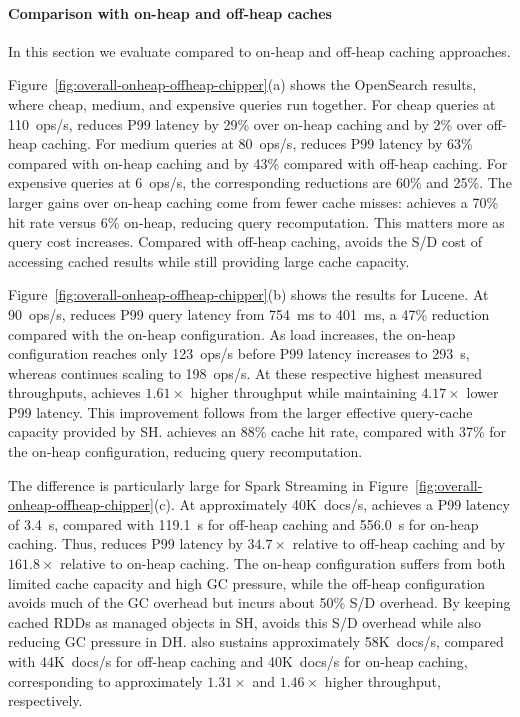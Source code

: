 \paragraph{\textbf{Comparison with on-heap and off-heap caches}}
In this section we evaluate \chipperName{} compared to on-heap and off-heap caching approaches.

Figure~\ref{fig:overall-onheap-offheap-chipper}(a) shows the OpenSearch results, where cheap, medium, and expensive queries run together.
For cheap queries at 110~ops/s, \chipperName{} reduces P99 latency by 29\% over on-heap caching and by 2\% over off-heap caching.
For medium queries at 80~ops/s, \chipperName{} reduces P99 latency by 63\% compared with on-heap caching and by 43\% compared with off-heap caching.
For expensive queries at 6~ops/s, the corresponding reductions are 60\% and 25\%.
The larger gains over on-heap caching come from fewer cache misses: \chipperName{} achieves a 70\% hit rate versus 6\% on-heap, reducing query recomputation.
This matters more as query cost increases.
Compared with off-heap caching, \chipperName{} avoids the S/D cost of accessing cached results while still providing large cache capacity.

Figure~\ref{fig:overall-onheap-offheap-chipper}(b) shows the results for Lucene.
At 90~ops/s, \chipperName{} reduces P99 query latency from 754~ms to 401~ms, a 47\% reduction compared with the on-heap configuration.
As load increases, the on-heap configuration reaches only 123~ops/s before P99 latency increases to 293~s, whereas \chipperName{} continues scaling to 198~ops/s.
At these respective highest measured throughputs, \chipperName{} achieves $1.61\times$ higher throughput while maintaining $4.17\times$ lower P99 latency.
This improvement follows from the larger effective query-cache capacity provided by SH.
\chipperName{} achieves an 88\% cache hit rate, compared with 37\% for the on-heap configuration, reducing query recomputation.

The difference is particularly large for Spark Streaming in Figure~\ref{fig:overall-onheap-offheap-chipper}(c).
At approximately 40K~docs/s, \chipperName{} achieves a P99 latency of 3.4~s, compared with 119.1~s for off-heap caching and 556.0~s for on-heap caching.
Thus, \chipperName{} reduces P99 latency by $34.7\times$ relative to off-heap caching and by $161.8\times$ relative to on-heap caching.
The on-heap configuration suffers from both limited cache capacity and high GC pressure, while the off-heap configuration avoids much of the GC overhead but incurs about 50\% S/D overhead.
By keeping cached RDDs as managed objects in SH, \chipperName{} avoids this S/D overhead while also reducing GC pressure in DH.
\chipperName{} also sustains approximately 58K~docs/s, compared with 44K~docs/s for off-heap caching and 40K~docs/s for on-heap caching, corresponding to approximately $1.31\times$ and $1.46\times$ higher throughput, respectively.

